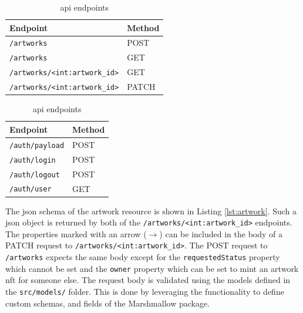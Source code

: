 \begin{table}[h]
    \begin{subtable}{0.45\textwidth}
        \centering
        \begin{tabular}{ll}
            \textbf{Endpoint}                    & \textbf{Method} \\ \hline
            \texttt{/artworks}                   & POST             \\
            \texttt{/artworks}                   & GET               \\
            \texttt{/artworks/<int:artwork\_id>} & GET                \\
            \texttt{/artworks/<int:artwork\_id>} & PATCH
        \end{tabular}
        \caption{Resource endpoints}
        \label{tab:resource_endpoints}
    \end{subtable}
    \hfill
    \begin{subtable}{0.45\textwidth}
        \centering
        \begin{tabular}{ll}
            \textbf{Endpoint}                       & \textbf{Method} \\ \hline
            \texttt{/auth/payload}               & POST                \\
            \texttt{/auth/login}                 & POST                 \\
            \texttt{/auth/logout}                & POST                  \\
            \texttt{/auth/user}                  & GET 
        \end{tabular}
        \caption{Authentication endpoints}
        \label{tab:authentication_endpoints}
    \end{subtable}
\caption{\gls{api} endpoints}
\end{table}

The \gls{json} schema of the artwork resource is shown in Listing \ref{lst:artwork}. Such a \gls{json} object is returned by both of the \texttt{/artworks/<int:artwork\_id>} endpoints. The properties marked with an arrow ($\rightarrow$) can be included in the body of a PATCH request to \texttt{/artworks/<int:artwork\_id>}. The POST request to \texttt{/artworks} expects the same body except for the \texttt{requestedStatus} property which cannot be set and the \texttt{owner} property which can be set to mint an artwork \gls{nft} for someone else. The request body is validated using the models defined in the \texttt{src/models/} folder. This is done by leveraging the functionality to define custom schemas, and fields of the Marshmallow \cite{marshmallow} package.

